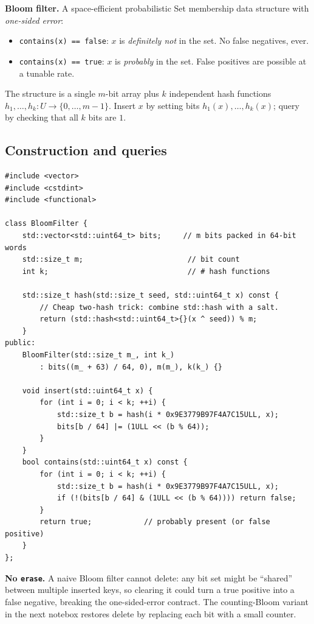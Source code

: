 \documentclass[11pt]{article}
\begin{document}
\begin{defnbox}
\textbf{Bloom filter.} A space-efficient probabilistic Set
membership data structure with \emph{one-sided error}:
\begin{itemize}[leftmargin=*]
    \item \texttt{contains(x) == false}: $x$ is \emph{definitely
          not} in the set. No false negatives, ever.
    \item \texttt{contains(x) == true}: $x$ is \emph{probably}
          in the set. False positives are possible at a tunable
          rate.
\end{itemize}
The structure is a single $m$-bit array plus $k$ independent hash
functions $h_1, \ldots, h_k : U \to \{0, \ldots, m-1\}$. Insert
$x$ by setting bits $h_1(x), \ldots, h_k(x)$; query by checking
that all $k$ bits are $1$.
\end{defnbox}

\subsection*{Construction and queries}

\begin{lstlisting}[basicstyle=\ttfamily\small,frame=single]
#include <vector>
#include <cstdint>
#include <functional>

class BloomFilter {
    std::vector<std::uint64_t> bits;     // m bits packed in 64-bit words
    std::size_t m;                        // bit count
    int k;                                // # hash functions

    std::size_t hash(std::size_t seed, std::uint64_t x) const {
        // Cheap two-hash trick: combine std::hash with a salt.
        return (std::hash<std::uint64_t>{}(x ^ seed)) % m;
    }
public:
    BloomFilter(std::size_t m_, int k_)
        : bits((m_ + 63) / 64, 0), m(m_), k(k_) {}

    void insert(std::uint64_t x) {
        for (int i = 0; i < k; ++i) {
            std::size_t b = hash(i * 0x9E3779B97F4A7C15ULL, x);
            bits[b / 64] |= (1ULL << (b % 64));
        }
    }
    bool contains(std::uint64_t x) const {
        for (int i = 0; i < k; ++i) {
            std::size_t b = hash(i * 0x9E3779B97F4A7C15ULL, x);
            if (!(bits[b / 64] & (1ULL << (b % 64)))) return false;
        }
        return true;            // probably present (or false positive)
    }
};
\end{lstlisting}

\textbf{No \texttt{erase}.} A naive Bloom filter cannot delete: any
bit set might be ``shared'' between multiple inserted keys, so
clearing it could turn a true positive into a false negative,
breaking the one-sided-error contract. The counting-Bloom variant
in the next notebox restores delete by replacing each bit with a
small counter.
\end{document}
